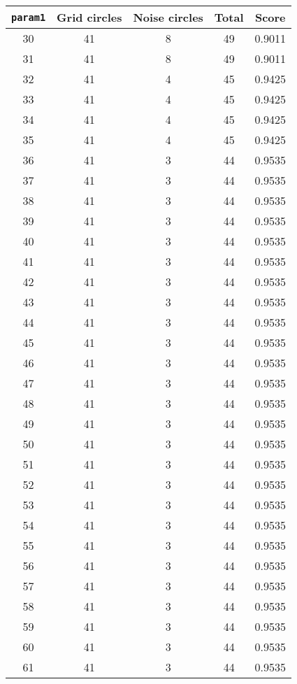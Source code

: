 \documentclass[letterpaper, 12pt]{article}
\begin{document}
\begin{longtable}{|c|c|c|c|c|}
\hline
\textbf{\texttt{param1}} & \textbf{Grid circles} & \textbf{Noise circles} & \textbf{Total} & \textbf{Score} \\
\hline
30 & 41 & 8 & 49 & 0.9011 \\
\hline
31 & 41 & 8 & 49 & 0.9011 \\
\hline
32 & 41 & 4 & 45 & 0.9425 \\
\hline
33 & 41 & 4 & 45 & 0.9425 \\
\hline
34 & 41 & 4 & 45 & 0.9425 \\
\hline
35 & 41 & 4 & 45 & 0.9425 \\
\hline
36 & 41 & 3 & 44 & 0.9535 \\
\hline
37 & 41 & 3 & 44 & 0.9535 \\
\hline
38 & 41 & 3 & 44 & 0.9535 \\
\hline
39 & 41 & 3 & 44 & 0.9535 \\
\hline
40 & 41 & 3 & 44 & 0.9535 \\
\hline
41 & 41 & 3 & 44 & 0.9535 \\
\hline
42 & 41 & 3 & 44 & 0.9535 \\
\hline
43 & 41 & 3 & 44 & 0.9535 \\
\hline
44 & 41 & 3 & 44 & 0.9535 \\
\hline
45 & 41 & 3 & 44 & 0.9535 \\
\hline
46 & 41 & 3 & 44 & 0.9535 \\
\hline
47 & 41 & 3 & 44 & 0.9535 \\
\hline
48 & 41 & 3 & 44 & 0.9535 \\
\hline
49 & 41 & 3 & 44 & 0.9535 \\
\hline
50 & 41 & 3 & 44 & 0.9535 \\
\hline
51 & 41 & 3 & 44 & 0.9535 \\
\hline
52 & 41 & 3 & 44 & 0.9535 \\
\hline
53 & 41 & 3 & 44 & 0.9535 \\
\hline
54 & 41 & 3 & 44 & 0.9535 \\
\hline
55 & 41 & 3 & 44 & 0.9535 \\
\hline
56 & 41 & 3 & 44 & 0.9535 \\
\hline
57 & 41 & 3 & 44 & 0.9535 \\
\hline
58 & 41 & 3 & 44 & 0.9535 \\
\hline
59 & 41 & 3 & 44 & 0.9535 \\
\hline
60 & 41 & 3 & 44 & 0.9535 \\
\hline
61 & 41 & 3 & 44 & 0.9535 \\

\end{longtable}
\end{document}
